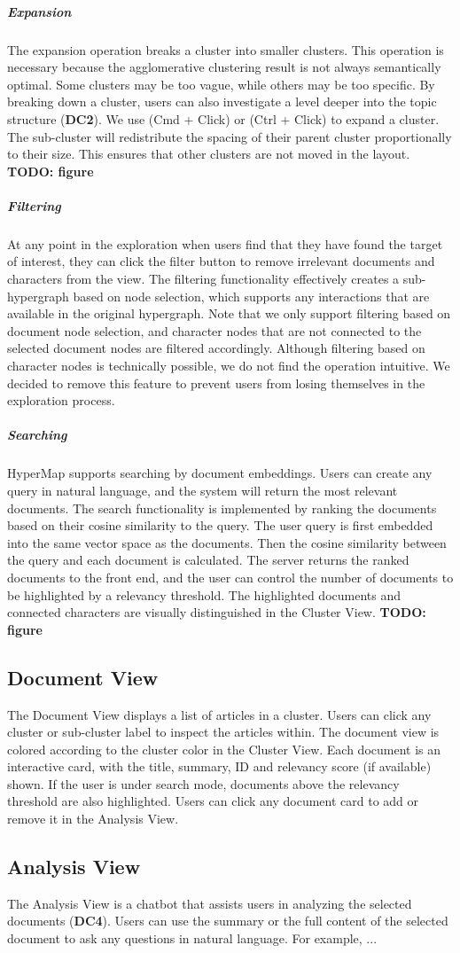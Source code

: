 \subparagraph{Expansion}
The expansion operation breaks a cluster into smaller clusters.
This operation is necessary because the agglomerative clustering result is not always semantically optimal.
Some clusters may be too vague, while others may be too specific.
By breaking down a cluster, users can also investigate a level deeper into the topic structure (\textbf{DC2}).
We use (Cmd + Click) or (Ctrl + Click) to expand a cluster.
The sub-cluster will redistribute the spacing of their parent cluster proportionally to their size.
This ensures that other clusters are not moved in the layout.
\textbf{TODO: figure}

\subparagraph{Filtering}
At any point in the exploration when users find that they have found the target of interest,
they can click the filter button to remove irrelevant documents and characters from the view.
The filtering functionality effectively creates a sub-hypergraph based on node selection, which supports any interactions that are available in the original hypergraph.
Note that we only support filtering based on document node selection, and character nodes that are not connected to the selected document nodes are filtered accordingly.
Although filtering based on character nodes is technically possible, we do not find the operation intuitive.
We decided to remove this feature to prevent users from losing themselves in the exploration process.

\subparagraph{Searching}
HyperMap supports searching by document embeddings.
Users can create any query in natural language, and the system will return the most relevant documents.
The search functionality is implemented by ranking the documents based on their cosine similarity to the query.
The user query is first embedded into the same vector space as the documents.
Then the cosine similarity between the query and each document is calculated.
The server returns the ranked documents to the front end, and the user can control the number of documents to be highlighted by a relevancy threshold. 
The highlighted documents and connected characters are visually distinguished in the Cluster View.
\textbf{TODO: figure}

\subsection{Document View}
The Document View displays a list of articles in a cluster.
Users can click any cluster or sub-cluster label to inspect the articles within.
The document view is colored according to the cluster color in the Cluster View.
Each document is an interactive card, with the title, summary, ID and relevancy score (if available) shown.
If the user is under search mode, documents above the relevancy threshold are also highlighted.
Users can click any document card to add or remove it in the Analysis View.

\subsection{Analysis View}
The Analysis View is a chatbot that assists users in analyzing the selected documents (\textbf{DC4}).
Users can use the summary or the full content of the selected document to ask any questions in natural language.
For example, ...

